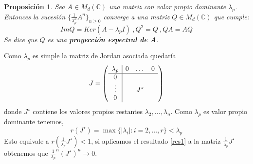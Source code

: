 \documentclass[size=a4, parskip=half, titlepage=false, toc=flat, toc=bib, 12pt]{scrartcl}
\makeatletter
\renewenvironment{proof}[1][\proofname] {\par\pushQED{\qed}\normalfont\topsep6\p@\@plus6\p@\relax\trivlist\item[\hskip\labelsep\itshape\sffamily#1\@addpunct{.}]\ignorespaces}{\popQED\endtrivlist\@endpefalse}
\theoremstyle{theorem-style}
\newtheorem{nprop}{Proposición}[section]
\theoremstyle{definition-style}
\theoremstyle{remark-style}
\theoremstyle{example-style}
\theoremstyle{definition-style}
\theoremstyle{remark-style}
\makeatother
\begin{document}
\begin{nprop} Sea $A \in M_d(\mathbb{C})$ una matriz con valor propio dominante $\lambda_p$. Entonces la sucesión $\{\frac{1}{ \lambda_p^n } A^n \}_{n\geq 0}$ converge a una matriz $Q \in M_d(\mathbb{C})$ que cumple:
$$ImQ = Ker ( A - \lambda_p I) \ , Q^2 = Q \ , QA = AQ $$
Se dice que $Q$ es una \textbf{proyección espectral de A}.
\end{nprop}

\begin{proof}
Como $\lambda_p$ es simple la matriz de Jordan asociada quedaría $$
  J =
    \left(
      \begin{array}{{c|ccc}}
        \lambda_p     &    0      &   \dots    & 0\\\hline
            0         &           &        &  \\
            \vdots    &           & J^{\star} &  \\
           0          &           &        &
      \end{array}
    \right)
$$ donde $J^{\star}$ contiene los valores propios restantes $\lambda_2, \dots, \lambda_n$.
Como $\lambda_p$ es valor propio dominante tenemos,
$$r(J^{\star}) = \max \{ |\lambda_i| : i = 2, \dots , r \} < \lambda_p $$
Esto equivale a $r(\frac{1}{\lambda_p} J^{\star}) < 1$, si aplicamos el resultado \ref{res1} a la matriz $\frac{1}{\lambda_p} J^{\star}$ obtenemos que $\frac{1}{\lambda_p}^n (J^{\star})^n \rightarrow 0$.


\end{proof}
\end{document}
